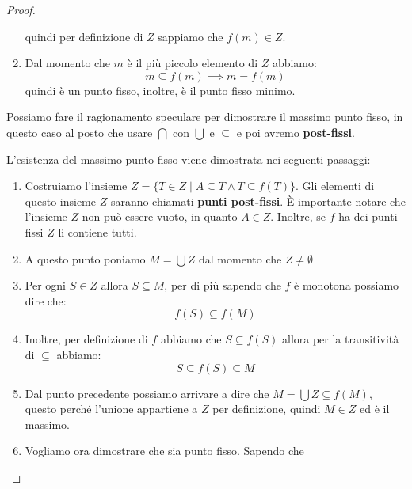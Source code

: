 \begin{teorema}
\begin{proof}
\begin{enumerate}
                  quindi per definizione di $Z$ sappiamo che $f(m)\in Z$.
            \item Dal momento che $m$ è il più piccolo elemento di $Z$ abbiamo:
                  \begin{equation}
                      m \subseteq f(m) \implies m = f(m)
                  \end{equation}
                  quindi è un punto fisso, inoltre, è il punto fisso minimo.
        \end{enumerate}
        Possiamo fare il ragionamento speculare per dimostrare il massimo punto
        fisso, in questo caso al posto che usare $\bigcap$ con $\bigcup$ e $\subseteq$
        e poi avremo \textbf{post-fissi}.

        L'esistenza del massimo punto fisso viene dimostrata nei seguenti passaggi:
        \begin{enumerate}
            \item Costruiamo l'insieme $Z = \{T\in Z \mid  A \subseteq T \land T \subseteq
                  f(T) \}$. Gli elementi di questo insieme $Z$ saranno chiamati
                  \textbf{punti post-fissi}. È importante notare che l'insieme $Z$
                  non può essere vuoto, in quanto $A \in Z$. Inoltre, se $f$ ha
                  dei punti fissi $Z$ li contiene tutti.
            \item A questo punto poniamo $M = \bigcup Z$ dal momento che $Z \neq
                      \emptyset$
            \item Per ogni $S \in Z$ allora $S\subseteq M$, per di più sapendo
                  che $f$ è monotona possiamo dire che:
                  \begin{equation}
                      f(S) \subseteq f(M)
                  \end{equation}
            \item Inoltre, per definizione di $f$ abbiamo che $S \subseteq f(S)$
                  allora per la transitività di $\subseteq$ abbiamo:
                  \begin{equation}
                     S \subseteq f(S) \subseteq M
                  \end{equation}
            \item Dal punto precedente possiamo arrivare a dire che $M = \bigcup Z \subseteq
                  f(M)$, questo perché l'unione appartiene a $Z$ per definizione, 
                  quindi $M \in Z$ ed è il massimo.
            \item Vogliamo ora dimostrare che sia punto fisso. Sapendo che

\end{enumerate}
\end{proof}
\end{teorema}
